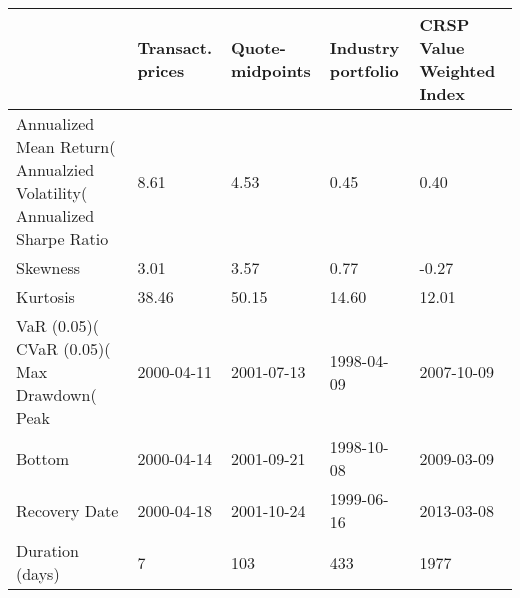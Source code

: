 \begin{tabular}{lllll}
\toprule
 & Transact. prices & Quote-midpoints & Industry portfolio & CRSP Value Weighted Index \\
\midrule
Annualized Mean Return(%
Annualzied Volatility(%
Annualized Sharpe Ratio & 8.61 & 4.53 & 0.45 & 0.40 \\
Skewness & 3.01 & 3.57 & 0.77 & -0.27 \\
Kurtosis & 38.46 & 50.15 & 14.60 & 12.01 \\
VaR (0.05)(%
CVaR (0.05)(%
Max Drawdown(%
Peak & 2000-04-11 & 2001-07-13 & 1998-04-09 & 2007-10-09 \\
Bottom & 2000-04-14 & 2001-09-21 & 1998-10-08 & 2009-03-09 \\
Recovery Date & 2000-04-18 & 2001-10-24 & 1999-06-16 & 2013-03-08 \\
Duration (days) & 7 & 103 & 433 & 1977 \\
\bottomrule
\end{tabular}
